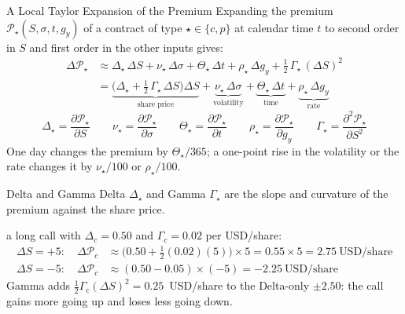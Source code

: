 \documentclass[aspectratio=169,11pt]{beamer}
\newcommand{\Pst}{\mathcal{P}_{\star}}
\begin{document}
\begin{frame}{A Local Taylor Expansion of the Premium}
  Expanding the premium $\Pst(S,\sigma,t,g_{y})$ of a contract of type
  $\star\in\{c,p\}$ at calendar time $t$ to second order in $S$ and first
  order in the other inputs gives:
  \begin{equation*}
    \boxed{
    \begin{aligned}
      \Delta\Pst &\approx \Delta_{\star}\,\Delta S + \nu_{\star}\,\Delta\sigma
      + \Theta_{\star}\,\Delta t + \rho_{\star}\,\Delta g_{y}
      + \tfrac{1}{2}\,\Gamma_{\star}\,(\Delta S)^{2}\\
      &= \underbrace{\bigl(\Delta_{\star} + \tfrac{1}{2}\,\Gamma_{\star}\,\Delta S\bigr)\Delta S}_{\text{share price}}
      + \underbrace{\nu_{\star}\,\Delta\sigma}_{\text{volatility}}
      + \underbrace{\Theta_{\star}\,\Delta t}_{\text{time}}
      + \underbrace{\rho_{\star}\,\Delta g_{y}}_{\text{rate}}
    \end{aligned}}
  \end{equation*}
  \begin{equation*}
    \Delta_{\star}=\frac{\partial\Pst}{\partial S}\qquad
    \nu_{\star}=\frac{\partial\Pst}{\partial \sigma}\qquad
    \Theta_{\star}=\frac{\partial\Pst}{\partial t}\qquad
    \rho_{\star}=\frac{\partial\Pst}{\partial g_{y}}\qquad
    \Gamma_{\star}=\frac{\partial^{2}\Pst}{\partial S^{2}}
  \end{equation*}
  One day changes the premium by $\Theta_{\star}/365$; a one-point rise in the
  volatility or the rate changes it by $\nu_{\star}/100$ or $\rho_{\star}/100$.
\end{frame}

\begin{frame}{Delta and Gamma}
  Delta $\Delta_{\star}$ and Gamma $\Gamma_{\star}$ are the slope and curvature
  of the premium against the share price.

  \vspace{0.5em}
  \textbf{} a long call with $\Delta_{c}=0.50$ and
  $\Gamma_{c}=0.02$ per USD/share:
  \begin{align*}
    \Delta S=+5:\quad \Delta\mathcal{P}_{c} &\approx \bigl(0.50+\tfrac{1}{2}(0.02)(5)\bigr)\times5=0.55\times5=2.75~\text{USD/share}\\
    \Delta S=-5:\quad \Delta\mathcal{P}_{c} &\approx (0.50-0.05)\times(-5)=-2.25~\text{USD/share}
  \end{align*}
  Gamma adds $\tfrac{1}{2}\Gamma_{c}(\Delta S)^{2}=0.25$~USD/share to the
  Delta-only $\pm2.50$: the call gains more going up and loses less going down.
\end{frame}
\end{document}
